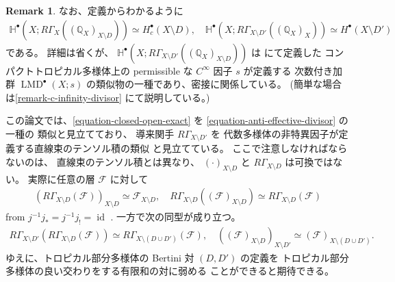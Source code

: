 \documentclass[a4paper,dvipdfmx,reqno,12pt]{amsart}
\theoremstyle{definition}
\newtheorem{remark}[theorem]{Remark}
\newcommand{\opn}[1]{\operatorname{#1}}
\numberwithin{equation}{section}
\begin{document}
\begin{remark}
なお、定義からわかるように
\begin{align}
\mathbb{H}^{\bullet}(X;R\Gamma_{X}
((\mathbb{Q}_X)_{X\setminus D}))
\simeq H^{\bullet}_c(X\setminus D), \quad
\mathbb{H}^{\bullet}(X;R\Gamma_{X\setminus D'}
((\mathbb{Q}_X)_{X}))
\simeq H^{\bullet}(X\setminus D')
\end{align}
である。
詳細は省くが、
$\mathbb{H}^{\bullet}(X;R\Gamma_{X\setminus D'}
((\mathbb{Q}_X)_{X\setminus D}))$
は \cite{tsutsui2023graded} にて定義した
コンパクトトロピカル多様体上の
permissible な $C^{\infty}$ 因子 $s$ が定義する
次数付き加群 $\opn{LMD}^{\bullet}(X;s)$
の類似物の一種であり、密接に関係している。
(簡単な場合は\cref{remark-c-infinity-divisor}
にて説明している。)



この論文では、\eqref{equation-closed-open-exact} を
\eqref{equation-anti-effective-divisor} の一種の
類似と見立てており、
導来関手 $R\Gamma_{X\setminus D'}$ を
代数多様体の非特異因子が定義する直線束のテンソル積の類似
と見立てている。
ここで注意しなければならないのは、
直線束のテンソル積とは異なり、
$(\cdot )_{X\setminus D}$
と $R\Gamma_{X\setminus D}$ は可換ではない。
実際に任意の層 $\mathcal{F}$ に対して
\begin{align}
(R\Gamma_{X\setminus D}(\mathcal{F}))_{X\setminus D}
\simeq 
\mathcal{F}_{X\setminus D}, \quad
R\Gamma_{X\setminus D}((\mathcal{F})_{X\setminus D})
\simeq R\Gamma_{X\setminus D}(\mathcal{F})
\end{align}
from $j^{-1}j_*=j^{-1}j_!=\opn{id}$
\cite[p.110]{MR842190}.
一方で次の同型が成り立つ。
\begin{align}
R\Gamma_{X\setminus D'}
(R\Gamma_{X\setminus D}(\mathcal{F}))
\simeq R\Gamma_{X\setminus (D\cup D')}(\mathcal{F}), \quad
((\mathcal{F})_{X\setminus D})_{X\setminus D'}
\simeq (\mathcal{F})_{X\setminus (D \cup D')}.
\end{align}
ゆえに、トロピカル部分多様体の Bertini 対 $(D,D')$ の定義を
トロピカル部分多様体の良い交わりをする有限和の対に弱める
ことができると期待できる。

\end{remark}
\end{document}
